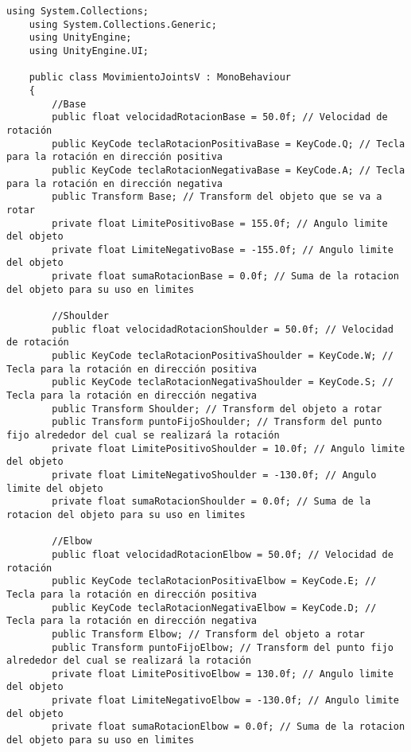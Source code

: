 \begin{lstlisting}[frame=single]
    using System.Collections;
    using System.Collections.Generic;
    using UnityEngine;
    using UnityEngine.UI;

    public class MovimientoJointsV : MonoBehaviour
    {
        //Base
        public float velocidadRotacionBase = 50.0f; // Velocidad de rotación
        public KeyCode teclaRotacionPositivaBase = KeyCode.Q; // Tecla para la rotación en dirección positiva
        public KeyCode teclaRotacionNegativaBase = KeyCode.A; // Tecla para la rotación en dirección negativa
        public Transform Base; // Transform del objeto que se va a rotar
        private float LimitePositivoBase = 155.0f; // Angulo limite del objeto
        private float LimiteNegativoBase = -155.0f; // Angulo limite del objeto
        private float sumaRotacionBase = 0.0f; // Suma de la rotacion del objeto para su uso en limites

        //Shoulder
        public float velocidadRotacionShoulder = 50.0f; // Velocidad de rotación
        public KeyCode teclaRotacionPositivaShoulder = KeyCode.W; // Tecla para la rotación en dirección positiva
        public KeyCode teclaRotacionNegativaShoulder = KeyCode.S; // Tecla para la rotación en dirección negativa
        public Transform Shoulder; // Transform del objeto a rotar
        public Transform puntoFijoShoulder; // Transform del punto fijo alrededor del cual se realizará la rotación
        private float LimitePositivoShoulder = 10.0f; // Angulo limite del objeto
        private float LimiteNegativoShoulder = -130.0f; // Angulo limite del objeto
        private float sumaRotacionShoulder = 0.0f; // Suma de la rotacion del objeto para su uso en limites

        //Elbow
        public float velocidadRotacionElbow = 50.0f; // Velocidad de rotación
        public KeyCode teclaRotacionPositivaElbow = KeyCode.E; // Tecla para la rotación en dirección positiva
        public KeyCode teclaRotacionNegativaElbow = KeyCode.D; // Tecla para la rotación en dirección negativa
        public Transform Elbow; // Transform del objeto a rotar
        public Transform puntoFijoElbow; // Transform del punto fijo alrededor del cual se realizará la rotación
        private float LimitePositivoElbow = 130.0f; // Angulo limite del objeto
        private float LimiteNegativoElbow = -130.0f; // Angulo limite del objeto
        private float sumaRotacionElbow = 0.0f; // Suma de la rotacion del objeto para su uso en limites


\end{lstlisting}
